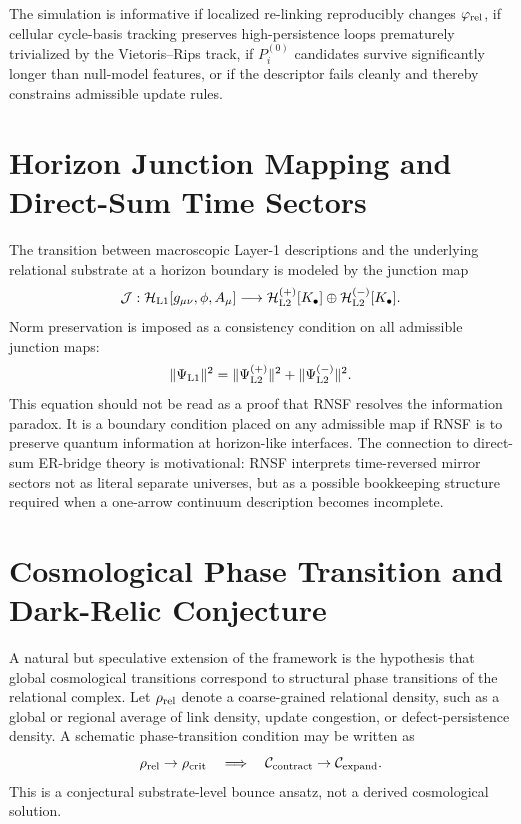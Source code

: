 \documentclass[11pt]{article}
\newcommand{\Ccal}{\mathcal{C}}
\newcommand{\Hcal}{\mathcal{H}}
\newcommand{\Jmap}{\mathcal{J}}
\newcommand{\Pre}{P_i^{(0)}}
\begin{document}
The simulation is informative if localized re-linking reproducibly changes \(\varphi_{\rm rel}\), if cellular cycle-basis tracking preserves high-persistence loops prematurely trivialized by the Vietoris--Rips track, if \(\Pre\) candidates survive significantly longer than null-model features, or if the descriptor fails cleanly and thereby constrains admissible update rules.

\section{Horizon Junction Mapping and Direct-Sum Time Sectors}
\label{sec:junction}

The transition between macroscopic Layer-1 descriptions and the underlying relational substrate at a horizon boundary is modeled by the junction map
\begin{equation}
    \Jmap:
    \Hcal_{\rm L1}[g_{\mu\nu},\phi,A_\mu]
    \longrightarrow
    \Hcal_{\rm L2}^{(+)}[K_\bullet]
    \oplus
    \Hcal_{\rm L2}^{(-)}[K_\bullet].
\end{equation}
Norm preservation is imposed as a consistency condition on all admissible junction maps:
\begin{equation}
    \|\Psi_{\rm L1}\|^2
    =
    \|\Psi_{\rm L2}^{(+)}\|^2
    +
    \|\Psi_{\rm L2}^{(-)}\|^2.
\end{equation}
This equation should not be read as a proof that RNSF resolves the information paradox. It is a boundary condition placed on any admissible map if RNSF is to preserve quantum information at horizon-like interfaces. The connection to direct-sum ER-bridge theory is motivational: RNSF interprets time-reversed mirror sectors not as literal separate universes, but as a possible bookkeeping structure required when a one-arrow continuum description becomes incomplete.

\section{Cosmological Phase Transition and Dark-Relic Conjecture}
\label{sec:dark-relics}

A natural but speculative extension of the framework is the hypothesis that global cosmological transitions correspond to structural phase transitions of the relational complex. Let \(\rho_{\rm rel}\) denote a coarse-grained relational density, such as a global or regional average of link density, update congestion, or defect-persistence density. A schematic phase-transition condition may be written as
\begin{equation}
    \rho_{\rm rel}\rightarrow\rho_{\rm crit}
    \quad\Longrightarrow\quad
    \Ccal_{\rm contract}\rightarrow\Ccal_{\rm expand}.
\end{equation}
This is a conjectural substrate-level bounce ansatz, not a derived cosmological solution.
\end{document}
